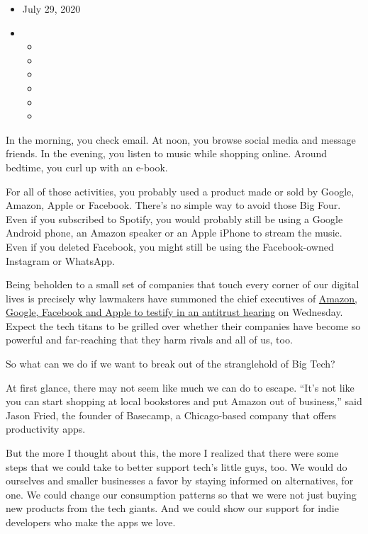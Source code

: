 \begin{itemize}
\item
  July 29, 2020
\item
  \begin{itemize}
  \item
  \item
  \item
  \item
  \item
  \item
  \end{itemize}
\end{itemize}

In the morning, you check email. At noon, you browse social media and
message friends. In the evening, you listen to music while shopping
online. Around bedtime, you curl up with an e-book.

For all of those activities, you probably used a product made or sold by
Google, Amazon, Apple or Facebook. There's no simple way to avoid those
Big Four. Even if you subscribed to Spotify, you would probably still be
using a Google Android phone, an Amazon speaker or an Apple iPhone to
stream the music. Even if you deleted Facebook, you might still be using
the Facebook-owned Instagram or WhatsApp.

Being beholden to a small set of companies that touch every corner of
our digital lives is precisely why lawmakers have summoned the chief
executives of
\href{https://www.nytimes3xbfgragh.onion/2020/07/28/technology/amazon-apple-facebook-google-antitrust-hearing.html}{Amazon,
Google, Facebook and Apple to testify in an antitrust hearing} on
Wednesday. Expect the tech titans to be grilled over whether their
companies have become so powerful and far-reaching that they harm rivals
and all of us, too.

So what can we do if we want to break out of the stranglehold of Big
Tech?

At first glance, there may not seem like much we can do to escape.
``It's not like you can start shopping at local bookstores and put
Amazon out of business,'' said Jason Fried, the founder of Basecamp, a
Chicago-based company that offers productivity apps.

But the more I thought about this, the more I realized that there were
some steps that we could take to better support tech's little guys, too.
We would do ourselves and smaller businesses a favor by staying informed
on alternatives, for one. We could change our consumption patterns so
that we were not just buying new products from the tech giants. And we
could show our support for indie developers who make the apps we love.

